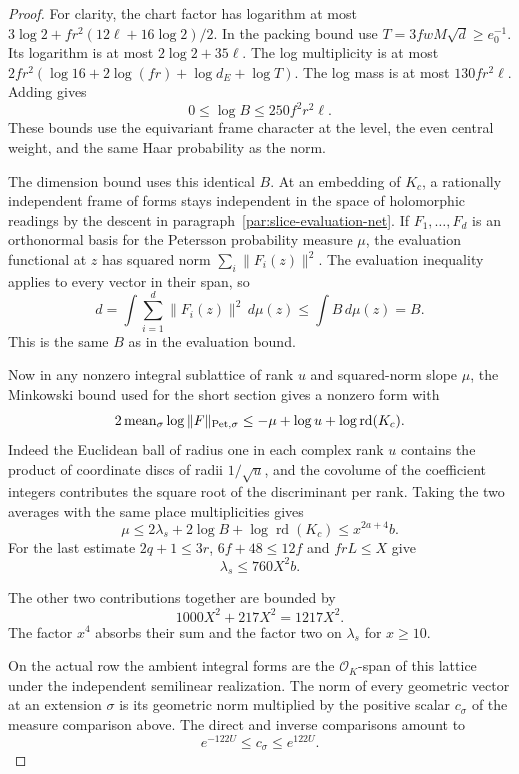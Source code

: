 \begin{proof}
For clarity, the chart factor has logarithm at most
\(3\log2+fr^2(12\ell+16\log2)/2\). In the packing bound use
\(T=3fwM\sqrt d\ge e_0^{-1}\). Its logarithm is at most
\(2\log2+35\ell\). The log multiplicity is at most
\(2fr^2(\log16+2\log(fr)+\log d_E+\log T)\).
The log mass is at most \(130fr^2\ell\).
Adding gives \[
 0\le\log B\le250 f^2r^2\ell.
\]
These bounds use the equivariant frame character at the level,
the even central weight, and the same Haar probability as the norm.
\label{cor:parent-cusp-slope-3}

The dimension bound uses this identical \(B\). At an embedding
of \(K_c\), a rationally independent frame of forms stays
independent in the space of holomorphic readings by the
descent in paragraph~\ref{par:slice-evaluation-net}. If \(F_1,\ldots,F_d\) is an orthonormal basis for the
Petersson probability measure \(\mu\), the evaluation functional
at \(z\) has squared norm \(\sum_i\|F_i(z)\|^2\). The evaluation
inequality applies to every vector in their span, so
\[
 d=\int\sum_{i=1}^d\|F_i(z)\|^2\,d\mu(z)
       \le\int B\,d\mu(z)=B.
\]
This is the same \(B\) as in the evaluation bound.

Now in any nonzero integral sublattice of rank \(u\) and
squared-norm slope \(\mu\), the Minkowski bound used for the
short section gives a nonzero form with
\[
 2\operatorname{mean}_{\sigma}\log\|F\|_{\rm Pet,\sigma}
      \le -\mu+\log u+\log\operatorname{rd}(K_c).
\]
Indeed the Euclidean ball of radius one in each complex rank
\(u\) contains the product of coordinate discs of radii
\(1/\sqrt u\), and the covolume of the coefficient integers
contributes the square root of the discriminant per rank.
Taking the two averages with the same place multiplicities
gives
\[
 \mu\le 2\lambda_s+2\log B+\log\operatorname{rd}(K_c)
              \le x^{2a+4}b .
\]
For the last estimate \(2q+1\le3r\), \(6f+48\le12f\) and
\(frL\le X\) give
\[
 \lambda_s\le760X^2 b.
\]

The other two contributions together are bounded by
\[
 1000X^2+217X^2=1217X^2.
\]
The factor \(x^4\) absorbs their sum
and the factor two on \(\lambda_s\) for \(x\ge10\).
\label{cor:parent-cusp-slope-4}

On the actual row the ambient integral forms are the
\(\mathcal O_K\)-span of this lattice under the independent
semilinear realization. The norm of every geometric vector
at an extension \(\sigma\) is its geometric norm multiplied
by the positive scalar \(c_\sigma\) of the measure comparison
above. The direct and inverse comparisons amount to
\[
 e^{-122U}\le c_\sigma\le e^{122U}.
\]


\end{proof}
